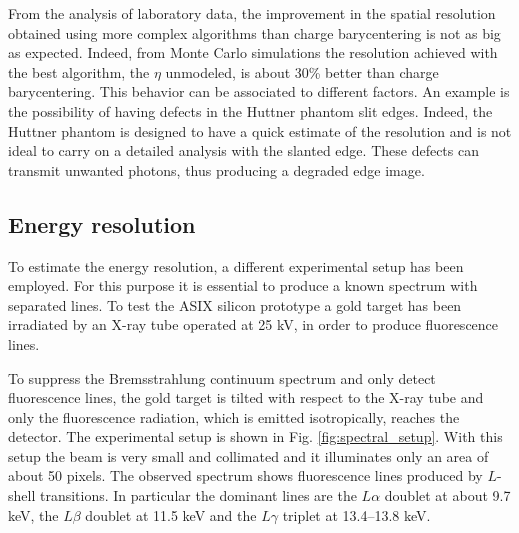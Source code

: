 From the analysis of laboratory data, the improvement in the spatial resolution obtained using more complex algorithms than charge barycentering is not as big as expected. Indeed, from Monte Carlo simulations the resolution achieved with the best algorithm, the $\eta$ unmodeled, is about 30\% better than charge barycentering. This behavior can be associated to different factors. An example is the possibility of having defects in the Huttner phantom slit edges. Indeed, the Huttner phantom is designed to have a quick estimate of the resolution and is not ideal to carry on a detailed analysis with the slanted edge. These defects can transmit unwanted photons, thus producing a degraded edge image.

\subsection{Energy resolution}
To estimate the energy resolution, a different experimental setup has been employed. For this purpose it is essential to produce a known spectrum with separated lines. To test the ASIX silicon prototype a gold target has been irradiated by an X-ray tube operated at 25 kV, in order to produce fluorescence lines.

To suppress the Bremsstrahlung continuum spectrum and only detect fluorescence lines, the gold target is tilted with respect to the X-ray tube and only the fluorescence radiation, which is emitted isotropically, reaches the detector. The experimental setup is shown in Fig. \ref{fig:spectral_setup}. With this setup the beam is very small and collimated and it illuminates only an area of about 50 pixels. The observed spectrum shows fluorescence lines produced by $L$-shell transitions. In particular the dominant lines are the $L\alpha$ doublet at about 9.7 keV, the $L\beta$ doublet at 11.5 keV and the $L\gamma$ triplet at 13.4--13.8 keV.

